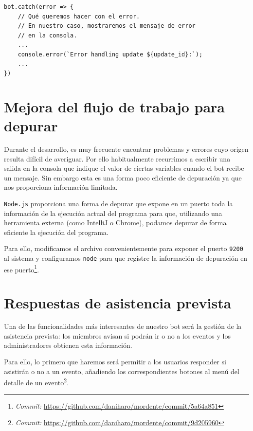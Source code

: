 \begin{verbatim}
bot.catch(error => {
    // Qué queremos hacer con el error. 
    // En nuestro caso, mostraremos el mensaje de error
    // en la consola.
    ...
    console.error(`Error handling update ${update_id}:`);
    ...
})
\end{verbatim}


\section{Mejora del flujo de trabajo para depurar}

Durante el desarrollo, es muy frecuente encontrar problemas y errores cuyo origen resulta difícil de averiguar. Por ello habitualmente recurrimos a escribir una salida en la consola que indique el valor de ciertas variables cuando el bot recibe un mensaje. Sin embargo esta es una forma poco eficiente de depuración ya que nos proporciona información limitada.

\texttt{Node.js} proporciona una forma de depurar que expone en un puerto toda la información de la ejecución actual del programa para que, utilizando una herramienta externa (como IntelliJ\cite{debugIntelliJ} o Chrome\cite{debugChrome}), podamos depurar de forma eficiente la ejecución del programa.

Para ello, modificamos el archivo  convenientemente para exponer el puerto \texttt{9200} al sistema y configuramos \texttt{node} para que registre la información de depuración en ese puerto\footnote{\textit{Commit:} \url{https://github.com/daniharo/mordente/commit/5a64a851}}.


\section{Respuestas de asistencia prevista}

Una de las funcionalidades más interesantes de nuestro bot será la gestión de la asistencia prevista: los miembros avisan si podrán ir o no a los eventos y los administradores obtienen esta información.

Para ello, lo primero que haremos será permitir a los usuarios responder si asistirán o no a un evento, añadiendo los correspondientes botones al menú del detalle de un evento\footnote{\textit{Commit:} \url{https://github.com/daniharo/mordente/commit/9d205960}}.


